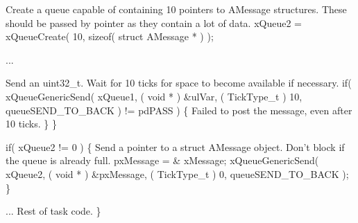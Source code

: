 \begin{DoxyPre}Create a queue capable of containing 10 pointers to AMessage structures.
These should be passed by pointer as they contain a lot of data.
    xQueue2 = xQueueCreate( 10, sizeof( struct AMessage * ) );\end{DoxyPre}



\begin{DoxyPre}...
\begin{DoxyVerb}if( xQueue1 != 0 )
{
\end{DoxyVerb}

Send an uint32\_t.  Wait for 10 ticks for space to become
available if necessary.
        if( xQueueGenericSend( xQueue1, ( void * ) \&ulVar, ( TickType\_t ) 10, queueSEND\_TO\_BACK ) != pdPASS )
        \{
Failed to post the message, even after 10 ticks.
        \}
    \}\end{DoxyPre}



\begin{DoxyPre}    if( xQueue2 != 0 )
    \{
Send a pointer to a struct AMessage object.  Don't block if the
queue is already full.
        pxMessage = \& xMessage;
        xQueueGenericSend( xQueue2, ( void * ) \&pxMessage, ( TickType\_t ) 0, queueSEND\_TO\_BACK );
    \}\end{DoxyPre}



\begin{DoxyPre}... Rest of task code.
 \}
 \end{DoxyPre}
 